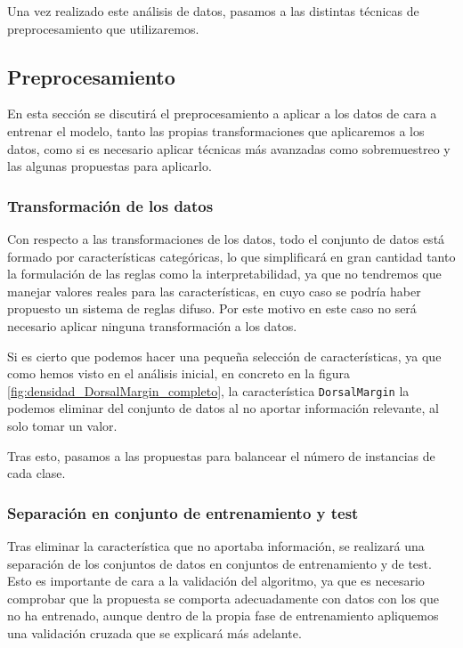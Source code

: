 Una vez realizado este análisis de datos, pasamos a las distintas técnicas de preprocesamiento que utilizaremos.


\subsection{Preprocesamiento} \label{sobremuestreo}

En esta sección se discutirá el preprocesamiento a aplicar a los datos de cara a entrenar el modelo, tanto las propias transformaciones que aplicaremos a los datos, como si es necesario aplicar técnicas más avanzadas como sobremuestreo y las algunas propuestas para aplicarlo.

\subsubsection{Transformación de los datos}

Con respecto a las transformaciones de los datos, todo el conjunto de datos está formado por características categóricas, lo que simplificará en gran cantidad tanto la formulación de las reglas como la interpretabilidad, ya que no tendremos que manejar valores reales para las características, en cuyo caso se podría haber propuesto un sistema de reglas difuso. Por este motivo en este caso no será necesario aplicar ninguna transformación a los datos.

Si es cierto que podemos hacer una pequeña selección de características, ya que como hemos visto en el análisis inicial, en concreto en la figura \ref{fig:densidad_DorsalMargin_completo}, la característica \texttt{DorsalMargin} la podemos eliminar del conjunto de datos al no aportar información relevante, al solo tomar un valor.

Tras esto, pasamos a las propuestas para balancear el número de instancias de cada clase.

\subsubsection{Separación en conjunto de entrenamiento y test}

Tras eliminar la característica que no aportaba información, se realizará una separación de los conjuntos de datos en conjuntos de entrenamiento y de test. Esto es importante de cara a la validación del algoritmo, ya que es necesario comprobar que la propuesta se comporta adecuadamente con datos con los que no ha entrenado, aunque dentro de la propia fase de entrenamiento apliquemos una validación cruzada que se explicará más adelante.

